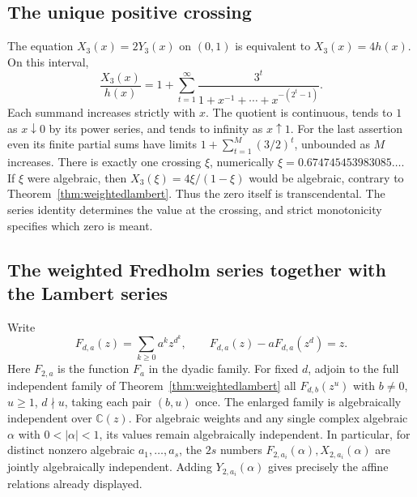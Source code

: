\documentclass[11pt,a4paper]{article}
\theoremstyle{definition}
\theoremstyle{remark}
\numberwithin{equation}{section}
\begin{document}
\subsection{The unique positive crossing}
The equation $X_3(x)=2Y_3(x)$ on $(0,1)$ is equivalent to
$X_3(x)=4h(x)$. On this interval,
\[
 \frac{X_3(x)}{h(x)}
  =1+\sum_{t=1}^{\infty}
       \frac{3^t}{1+x^{-1}+\cdots+x^{-(2^t-1)}}.
\]
Each summand increases strictly with $x$. The quotient is continuous,
tends to $1$ as $x\downarrow0$ by its power series, and tends to
infinity as $x\uparrow1$. For the last assertion even its finite
partial sums have limits $1+\sum_{t=1}^M(3/2)^t$, unbounded as
$M$ increases. There is exactly one crossing $\xi$, numerically
$\xi=0.674745453983085\ldots$. If $\xi$ were algebraic, then
$X_3(\xi)=4\xi/(1-\xi)$ would be algebraic, contrary to
Theorem~\ref{thm:weightedlambert}. Thus the zero itself is
transcendental. The series identity determines the value at the
crossing, and strict monotonicity specifies which zero is meant.

\subsection{The weighted Fredholm series together with the Lambert series}
Write
\[
 F_{d,a}(z)=\sum_{k\ge0}a^kz^{d^k},\qquad F_{d,a}(z)-aF_{d,a}(z^d)=z .
\]
Here $F_{2,a}$ is the function $F_a$ in the dyadic family.
For fixed $d$, adjoin to the full independent family of
Theorem~\ref{thm:weightedlambert} all $F_{d,b}(z^u)$ with
$b\ne0$, $u\ge1$, $d\nmid u$, taking each pair $(b,u)$ once.
The enlarged family is algebraically independent over $\mathbb C(z)$.
For algebraic weights and any single complex algebraic $\alpha$ with
$0<|\alpha|<1$, its values remain algebraically independent. In
particular, for distinct nonzero algebraic $a_1,\ldots,a_s$, the
$2s$ numbers $F_{2,a_i}(\alpha),X_{2,a_i}(\alpha)$ are jointly
algebraically independent. Adding $Y_{2,a_i}(\alpha)$ gives precisely
the affine relations already displayed.
\end{document}
